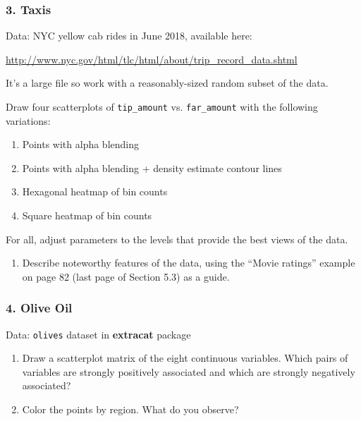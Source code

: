 \documentclass[]{article}
\providecommand{\tightlist}{%
  \setlength{\itemsep}{0pt}\setlength{\parskip}{0pt}}
\begin{document}
\subsubsection{3. Taxis}\label{taxis}

Data: NYC yellow cab rides in June 2018, available here:

\url{http://www.nyc.gov/html/tlc/html/about/trip_record_data.shtml}

It's a large file so work with a reasonably-sized random subset of the
data.

Draw four scatterplots of \texttt{tip\_amount} vs. \texttt{far\_amount}
with the following variations:

\begin{enumerate}
\def\labelenumi{(\alph{enumi})}
\item
  Points with alpha blending
\item
  Points with alpha blending + density estimate contour lines
\item
  Hexagonal heatmap of bin counts
\item
  Square heatmap of bin counts
\end{enumerate}

For all, adjust parameters to the levels that provide the best views of
the data.

\begin{enumerate}
\def\labelenumi{(\alph{enumi})}
\setcounter{enumi}{4}
\tightlist
\item
  Describe noteworthy features of the data, using the ``Movie ratings''
  example on page 82 (last page of Section 5.3) as a guide.
\end{enumerate}

\subsubsection{4. Olive Oil}\label{olive-oil}

Data: \texttt{olives} dataset in \textbf{extracat} package

\begin{enumerate}
\def\labelenumi{(\alph{enumi})}
\item
  Draw a scatterplot matrix of the eight continuous variables. Which
  pairs of variables are strongly positively associated and which are
  strongly negatively associated?
\item
  Color the points by region. What do you observe?
\end{enumerate}
\end{document}
